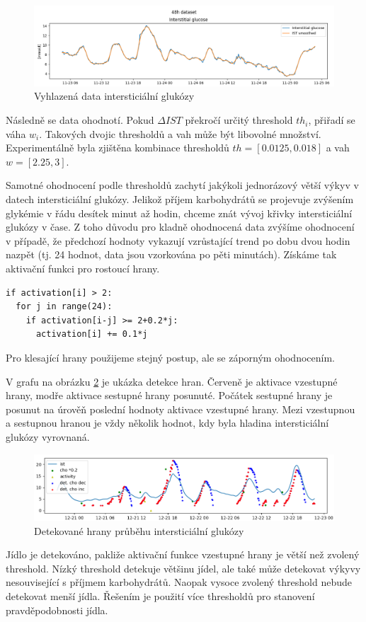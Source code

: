 \begin{figure}[H]
\caption{Vyhlazená data intersticiální glukózy}
\label{fig:savgol}
\centering
\includegraphics[width=1\textwidth]{img/cho/savgol.png}
\end{figure}

Následně se data ohodnotí. Pokud $\Delta IST$ překročí určitý threshold $th_{i}$, přiřadí se váha $w_{i}$. Takových dvojic thresholdů a vah může být libovolné množství. Experimentálně byla zjištěna kombinace thresholdů $th=[0.0125, 0.018]$ a vah $w=[2.25, 3]$.

Samotné ohodnocení podle thresholdů zachytí jakýkoli jednorázový větší výkyv v datech intersticiální glukózy. Jelikož příjem karbohydrátů se projevuje zvýšením glykémie v řádu desítek minut až hodin, chceme znát vývoj křivky intersticiální glukózy v čase. Z toho důvodu pro kladně ohodnocená data zvýšíme ohodnocení v případě, že předchozí hodnoty vykazují vzrůstající trend po dobu dvou hodin nazpět (tj. 24 hodnot, data jsou vzorkována po pěti minutách). Získáme tak aktivační funkci pro rostoucí hrany.
\begin{verbatim}
if activation[i] > 2:
  for j in range(24):
    if activation[i-j] >= 2+0.2*j:
      activation[i] += 0.1*j
\end{verbatim}
Pro klesající hrany použijeme stejný postup, ale se záporným ohodnocením.

V grafu na obrázku \ref{fig:hrany} je ukázka detekce hran. Červeně je aktivace vzestupné hrany, modře aktivace sestupné hrany posunuté. Počátek sestupné hrany je posunut na úrověň poslední hodnoty aktivace vzestupné hrany. Mezi vzestupnou a sestupnou hranou je vždy několik hodnot, kdy byla hladina intersticiální glukózy vyrovnaná.

\begin{figure}[H]
\caption{Detekované hrany průběhu intersticiální glukózy}
\label{fig:hrany}
\centering
\includegraphics[width=1\textwidth]{img/cho/hrany.png}
\end{figure}

Jídlo je detekováno, pakliže aktivační funkce vzestupné hrany je větší než zvolený threshold. Nízký threshold detekuje většinu jídel, ale také může detekovat výkyvy nesouvisející s příjmem karbohydrátů. Naopak vysoce zvolený threshold nebude detekovat menší jídla. Řešením je použití více thresholdů pro stanovení pravděpodobnosti jídla.